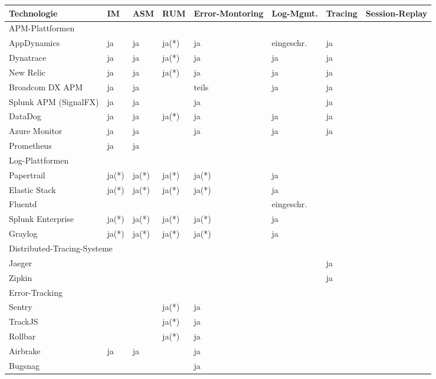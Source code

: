 \begingroup
\centering
\setlength{\LTleft}{-20cm plus -1fill}
\setlength{\LTright}{\LTleft}
\begin{longtable}{|p{4.10cm}|p{0.90cm}|p{0.90cm}|p{1.9cm}|p{1.75cm}|p{1.5cm}|p{1.4cm}|p{1.3cm}|}
\hline
Technologie & IM & ASM & RUM & Error-Montoring & Log-Mgmt. & Tracing & Session-Replay \\
\endhead
\hline
\hline
\multicolumn{8}{|l|}{APM-Plattformen} \\
\hline
AppDynamics & ja & ja & ja(*) & ja & eingeschr. & ja &  \\
\hline
Dynatrace & ja & ja & ja(*) & ja & ja & ja &  \\
\hline
New Relic & ja & ja & ja(*) & ja & ja & ja &  \\
\hline
Broadcom DX APM & ja & ja &  & teils & ja & ja &  \\
\hline
Splunk APM (SignalFX) & ja & ja &  & ja &  & ja &  \\
\hline
DataDog & ja & ja & ja(*) & ja & ja & ja &  \\
\hline
Azure Monitor & ja & ja &  & ja & ja & ja &  \\
\hline
Prometheus & ja & ja &  &  &  &  &  \\
\hline
\hline
\multicolumn{8}{|l|}{Log-Plattformen} \\
\hline
Papertrail & ja(*) & ja(*) & ja(*) & ja(*) & ja &  &  \\
\hline
Elastic Stack & ja(*) & ja(*) & ja(*) & ja(*) & ja &  &  \\
\hline
Fluentd &  &  &  &  & eingeschr. &  &  \\
\hline
Splunk \mbox{Enterprise} & ja(*) & ja(*) & ja(*) & ja(*) & ja &  &  \\
\hline
Graylog & ja(*) & ja(*) & ja(*) & ja(*) & ja &  &  \\
\hline
\hline
\multicolumn{8}{|l|}{Distributed-Tracing-Systeme} \\
\hline
Jaeger &  &  &  &  &  & ja &  \\
\hline
Zipkin &  &  &  &  &  & ja &  \\
\hline
\hline
\multicolumn{8}{|l|}{Error-Tracking} \\
\hline
Sentry &  &  & ja(*) & ja &  &  &  \\
\hline
TrackJS &  &  & ja(*) & ja &  &  &  \\
\hline
Rollbar &  &  & ja(*) & ja &  &  &  \\
\hline
Airbrake & ja & ja &  & ja &  &  &  \\
\hline
Bugsnag &  &  &  & ja &  &  &  \\

\end{longtable}
